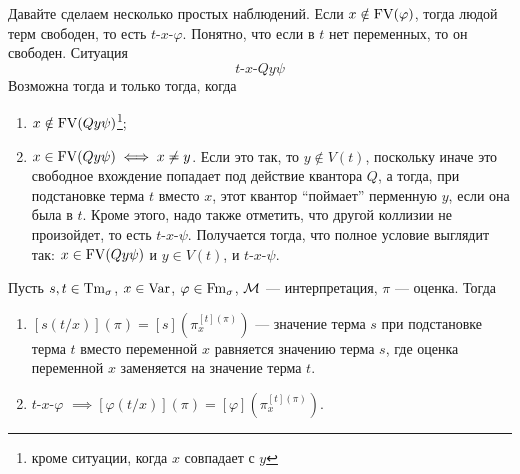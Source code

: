 Давайте сделаем несколько простых наблюдений.
Если $x \notin \mathrm{FV}(\varphi)$, тогда людой терм свободен, то есть $t$-$x$-$\varphi$.
Понятно, что если в $t$ нет переменных, то он свободен.
Ситуация
$$
    t\text{-}x\text{-}Qy\psi
$$
Возможна тогда и только тогда, когда
\begin{enumerate}
    \item $x \notin \mathrm{FV}(Qy\psi)$\footnote{кроме ситуации, когда $x$ совпадает с $y$};
    \item $x \in \FreeVar(Qy\psi) \iff x \centernot\eqcirc y$.
    Если это так, то $y \notin V(t)$, поскольку иначе это свободное вхождение попадает под действие квантора $Q$, а тогда, при подстановке терма $t$ вместо $x$, этот квантор \enquote{поймает} перменную $y$, если она была в $t$.
    Кроме этого, надо также отметить, что другой коллизии не произойдет, то есть $t$-$x$-$\psi$.
    Получается тогда, что полное условие выглядит так: $x \in \mathrm{FV}(Qy\psi)$ и $y \in V(t)$, и $t$-$x$-$\psi$.
\end{enumerate}

\begin{lemma} \label{lemma::correct-substitution}
    Пусть $s, t \in \mathrm{Tm}_{\sigma}$, $x \in \mathrm{Var}$, $\varphi \in \mathrm{Fm}_{\sigma}$, $\mathcal{M}$ --- интерпретация, $\pi$ --- оценка.
    Тогда
    \begin{enumerate}
        \item $[s(t/x)](\pi) = [s](\pi_{x}^{[t](\pi)})$ --- значение терма $s$ при подстановке терма $t$ вместо переменной $x$ равняется значению терма $s$, где оценка переменной $x$ заменяется на значение терма $t$.
        \item $t$-$x$-$\varphi$ $\implies [\varphi(t/x)](\pi) = [\varphi](\pi_{x}^{[t](\pi)})$.
    \end{enumerate}
\end{lemma}

